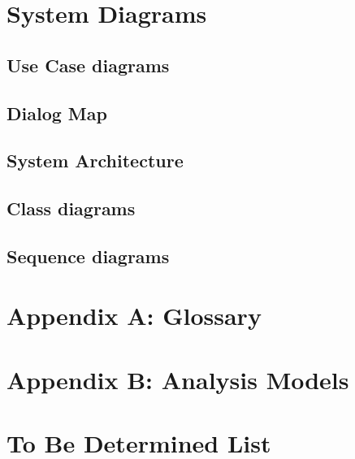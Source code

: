 \documentclass[a4paper]{scrreprt}
\begin{document}
\chapter{System Diagrams}
\section{Use Case diagrams}
\section{Dialog Map}
\section{System Architecture}
\section{Class diagrams}
\section{Sequence diagrams}


\chapter{Appendix A: Glossary}

\chapter{Appendix B: Analysis Models}

\chapter{To Be Determined List}
\end{document}
